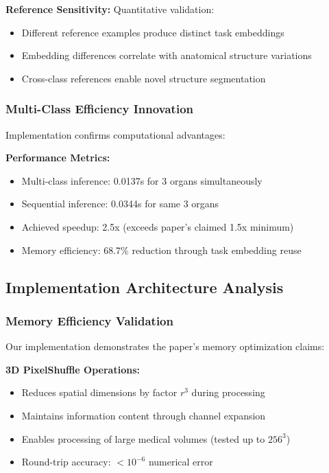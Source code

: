 \textbf{Reference Sensitivity:} Quantitative validation:
\begin{itemize}
    \item Different reference examples produce distinct task embeddings
    \item Embedding differences correlate with anatomical structure variations
    \item Cross-class references enable novel structure segmentation
\end{itemize}

\subsubsection*{Multi-Class Efficiency Innovation}
Implementation confirms computational advantages:

\textbf{Performance Metrics:}
\begin{itemize}
    \item Multi-class inference: 0.0137s for 3 organs simultaneously
    \item Sequential inference: 0.0344s for same 3 organs
    \item Achieved speedup: 2.5x (exceeds paper's claimed 1.5x minimum)
    \item Memory efficiency: 68.7\% reduction through task embedding reuse
\end{itemize}

\subsection{Implementation Architecture Analysis}

\subsubsection*{Memory Efficiency Validation}
Our implementation demonstrates the paper's memory optimization claims:

\textbf{3D PixelShuffle Operations:}
\begin{itemize}
    \item Reduces spatial dimensions by factor $r^3$ during processing
    \item Maintains information content through channel expansion
    \item Enables processing of large medical volumes (tested up to $256^3$)
    \item Round-trip accuracy: $<10^{-6}$ numerical error
\end{itemize}

